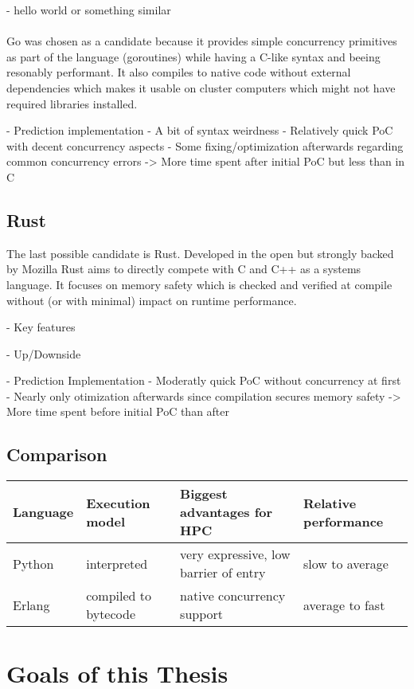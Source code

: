 - hello world or something similar
\\ \\
Go was chosen as a candidate because it provides simple concurrency primitives as part of the language (goroutines) while having a C-like syntax and beeing resonably performant. It also compiles to native code without external dependencies which makes it usable on cluster computers which might not have required libraries installed.

- Prediction implementation
    - A bit of syntax weirdness
    - Relatively quick PoC with decent concurrency aspects
    - Some fixing/optimization afterwards regarding common concurrency errors
    -> More time spent after initial PoC but less than in C


\subsection*{Rust}
\label{ssec:Candidates.Rust}
The last possible candidate is Rust. Developed in the open but strongly backed by Mozilla Rust aims to directly compete with C and C++ as a systems language. It focuses on memory safety which is checked and verified at compile without (or with minimal) impact on runtime performance.

- Key features

- Up/Downside

- Prediction Implementation
    - Moderatly quick PoC without concurrency at first
    - Nearly only otimization afterwards since compilation secures memory safety
    -> More time spent before initial PoC than after


\subsection*{Comparison}
\label{ssec:Candidates.Comparison}

\begin{tabular}{llll}
    \toprule
    Language
        & Execution model
        & Biggest advantages for HPC
        & Relative performance \\
    \midrule
    Python
        & interpreted
        & very expressive, low barrier of entry
        & slow to average \\
    Erlang
        & compiled to bytecode
        & native concurrency support
        & average to fast \\
    \bottomrule
\end{tabular}

\section{Goals of this Thesis}
\label{sec:Goals}
